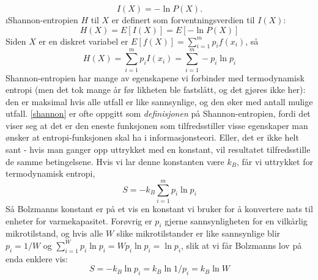 \begin{equation}
	I(X)=-\ln P(X).
\end{equation}
\i{Shannon-entropi}en $H$ til $X$ er definert som forventningsverdien til $I(X)$:
\begin{equation}
	H(X)=E[I(X)]=E[-\ln P(X)]
\end{equation}
Siden $X$ er en diskret variabel er $E[f(X)]=\sum_{i=1}^m p_if(x_i)$, så
\begin{equation}
	\label{shannon}
	H(X)=\sum_{i=1}^m p_iI(x_i) = \sum_{i=1}^m -p_i\ln p_i
\end{equation}
Shannon-entropien har mange av egenskapene vi forbinder med termodynamisk entropi (men det tok mange år før likheten ble fastslått, og det gjøres ikke her): den er maksimal hvis alle utfall er like sannsynlige, og den øker med antall mulige utfall. \eqref{shannon} er ofte oppgitt som \emph{definisjonen} på Shannon-entropien, fordi det viser seg at det er den eneste funksjonen som tilfredsstiller visse egenskaper man ønsker at entropi-funksjonen skal ha i informasjonsteori. Eller, det er ikke helt sant - hvis man ganger opp uttrykket med en konstant, vil resultatet tilfredsstille de samme betingelsene. Hvis vi lar denne konstanten være $k_B$, får vi uttrykket for termodynamisk entropi,
\begin{equation}
	\label{thermo-entropy}
	S = -k_B\sum_{i=1}^m p_i\ln p_i
\end{equation}
Så Bolzmanns konstant er på et vis en konstant vi bruker for å konvertere nats til enheter for varmekapasitet. Forøvrig er $p_i$ gjerne sannsynligheten for en vilkårlig mikrotilstand, og hvis alle $W$ slike mikrotilstander er like sannsynlige blir $p_i=1/W$ og $\sum_{i=1}^W p_i\ln p_i=Wp_i\ln p_i=\ln p_i$, slik at vi får Bolzmanns lov på enda enklere vis:
\begin{equation}
	S =-k_B\ln p_i = k_B\ln 1/p_i = k_B\ln W
\end{equation}